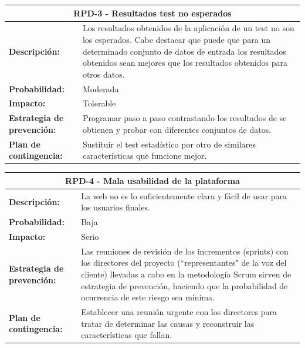 \begin{table}[H]
	\begin{tabular}{| p{4cm}| p{10cm} |}
		\hline
		\multicolumn{2}{|c|}{\textbf{RPD-3} - Resultados test no esperados} \\ \hline
		\textbf{Descripción:} & Los resultados obtenidos de la aplicación de un test no son los esperados. Cabe destacar que puede que para un determinado conjunto de datos de entrada los resultados obtenidos sean mejores que los resultados obtenidos para otros datos. \\ \hline
		\textbf{Probabilidad:} & Moderada \\ \hline
		\textbf{Impacto:} & Tolerable \\ \hline
		\textbf{Estrategia de prevención:} & Programar paso a paso contrastando los resultados de se obtienen y probar con diferentes conjuntos de datos. \\ \hline
		\textbf{Plan de contingencia:} & Sustituir el test estadístico por otro de similares características que funcione mejor. \\ \hline
	\end{tabular}
\end{table}

\begin{table}[H]
	\begin{tabular}{| p{4cm}| p{10cm} |}
		\hline
		\multicolumn{2}{|c|}{\textbf{RPD-4} - Mala usabilidad de la plataforma} \\ \hline
		\textbf{Descripción:} & La web no es lo suficientemente clara y fácil de usar para los usuarios finales. \\ \hline
		\textbf{Probabilidad:} & Baja \\ \hline
		\textbf{Impacto:} & Serio \\ \hline
		\textbf{Estrategia de prevención:} & Las reuniones de revisión de los incrementos (sprints) con los directores del proyecto (``representantes" de la voz del cliente) llevadas a cabo en la metodología Scrum sirven de estrategia de prevención, haciendo que la probabilidad de ocurrencia de este riesgo sea mínima. \\ \hline
		\textbf{Plan de contingencia:} & Establecer una reunión urgente con los directores para tratar de determinar las causas y reconstruir las características que fallan. \\ \hline
	\end{tabular}
\end{table}

